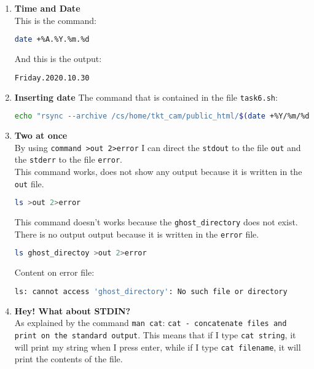 \documentclass[9pt]{article}
\begin{document}
\begin{enumerate}
\begin{lstlisting}[language=bash,breaklines=true]
sent 370,108 bytes  received 107 bytes  740,430.00 bytes/sec
total size is 9,712,499  speedup is 26.23
		\end{lstlisting}

	\item \textbf{Time and Date}\\
		This is the command:
		\begin{lstlisting}[language=bash]
date +%A.%Y.%m.%d 
		\end{lstlisting}
		And this is the output:
		\begin{lstlisting}[language=bash]
Friday.2020.10.30
		\end{lstlisting}
		
	\item \textbf{Inserting date}
		The command that is contained in the file \texttt{task6.sh}:
		\begin{lstlisting}[language=bash,breaklines=true]
echo "rsync --archive /cs/home/tkt_cam/public_html/$(date +%Y/%m/%d)/~/ShellScripting2019/Week1/$(date +%A.%Y.%m.%d)"
		\end{lstlisting}
		
	\item \textbf{Two at once}\\
		By using \texttt{command >out 2>error} I can direct the \texttt{stdout} to the file \texttt{out} and the \texttt{stderr} to the file \texttt{error}.\\
		This command works, does not show any output because it is written in the \texttt{out} file.
		\begin{lstlisting}[language=bash]
ls >out 2>error
		\end{lstlisting}
		This command doesn't works because the \texttt{ghost\_directory} does not exist.
		There is no output output because it is written in the \texttt{error} file.
		\begin{lstlisting}[language=bash]
ls ghost_directoy >out 2>error
		\end{lstlisting}
		Content on error file:
		\begin{lstlisting}[language=bash]
ls: cannot access 'ghost_directory': No such file or directory
		\end{lstlisting}
		
	\item \textbf{Hey! What about STDIN?}\\
		As explained by the command \texttt{man cat}: \texttt{cat - concatenate files and print on the standard output}.
		This means that if I type \texttt{cat string}, it will print my string when I press enter, while if I type \texttt{cat filename}, it will print the contents of the file.
	
\end{enumerate}
\end{document}
